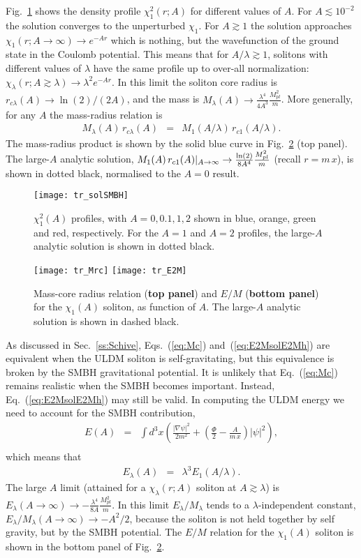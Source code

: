 \documentclass[aps,prd,floats,superscriptaddress,showpacs,nofootinbib,twocolumn,preprintnumbers]{revtex4-1}%
\def\be{\begin{eqnarray}}
\def\ee{\end{eqnarray}}
\def\no{\nonumber}
\begin{document}
\begin{appendix}
Fig.~\ref{fig:solSMBH} shows the density profile $\chi^2_1(r;A)$ for
different values of $A$. For $A\lesssim10^{-2}$ the solution converges
to the unperturbed $\chi_1$. For $A\gtrsim1$ the solution approaches
$\chi_1(r;A\to\infty)\to e^{-Ar}$ which is nothing, but the
wavefunction of the ground state in the Coulomb potential. 
This means that for
$A/\lambda\gtrsim1$, solitons with different values of $\lambda$ have
the same profile up to over-all normalization:
$\chi_\lambda(r;A\gtrsim\lambda)\to\lambda^2e^{-Ar}$. In this limit
the soliton core radius is $r_{c\lambda}(A)\to\ln(2)/(2A)$, and the
mass is
$M_\lambda(A)\to\frac{\lambda^4}{4A^3}\frac{M_{pl}^2}{m}$. More
generally, for any $A$ the mass-radius relation is 
%
\be M_\lambda(A)\,r_{c\lambda}(A)&=&M_1(A/\lambda)\,r_{c1}(A/\lambda).\ee
%
The mass-radius product is shown by the solid blue curve in
Fig.~\ref{fig:Mrc} (top panel). The large-$A$ analytic solution,
$M_1(A)\,r_{c1}(A)\huge|_{A\to\infty}\to
\frac{\ln(2)}{8A^4}\frac{M_{pl}^2}{m}$ (recall $r=m\,x$), is
shown in dotted black, normalised to the $A=0$ result. 
%
\begin{figure}[hbp!]
\centering
\texttt{[image: tr\_solSMBH]}
\caption{
$\chi_1^2(A)$ profiles, with $A=0,0.1,1,2$ shown in blue, orange, green and red, respectively. For the $A=1$ and $A=2$ profiles, the large-$A$ analytic solution is shown in dotted black. 
}\label{fig:solSMBH}
\end{figure}
%
%
\begin{figure}[hbp!]
\centering
\texttt{[image: tr\_Mrc]}
\texttt{[image: tr\_E2M]}
\caption{
Mass-core radius relation ({\bf top panel}) and $E/M$ ({\bf bottom panel}) for the $\chi_1(A)$ soliton, as function of $A$. The large-$A$ analytic solution is shown in dashed black.}\label{fig:Mrc}
\end{figure}
%

As discussed in Sec.~\ref{ss:Schive}, Eqs.~(\ref{eq:Mc})
and~(\ref{eq:E2MsolE2Mh}) are equivalent when the ULDM soliton is
self-gravitating, but this equivalence is broken by the SMBH
gravitational potential. It is unlikely that Eq.~(\ref{eq:Mc}) remains
realistic when the SMBH becomes important. Instead,
Eq.~(\ref{eq:E2MsolE2Mh}) may still be valid.  
%
In computing the ULDM energy we need to account for the SMBH contribution,
%
\be \label{eq:EgenBH}E(A)&=&\int d^3x
\left(\frac{\left|\nabla\psi\right|^2}{2m^2}+\left(\frac{\Phi}{2}
-\frac{A}{m\,x}\right)\left|\psi\right|^2\right),\no\\
&&\ee
%
which means that
%
\be E_\lambda(A)&=&\lambda^3E_1(A/\lambda).\ee
%
The large $A$ limit (attained for a $\chi_\lambda(r;A)$ soliton at
$A\gtrsim\lambda$) is
$E_\lambda(A\to\infty)\to-\frac{\lambda^4}{8A}\frac{M_{pl}^2}{m}$. In
this limit $E_\lambda/M_\lambda$ tends to a $\lambda$-independent
constant, $E_\lambda/M_\lambda(A\to\infty)\to-A^2/2$, because the
soliton is not held together by self gravity, but by the SMBH
potential.  
%
The $E/M$ relation for the $\chi_1(A)$ soliton is shown in the bottom
panel of Fig.~\ref{fig:Mrc}.  


\end{appendix}
\end{document}
